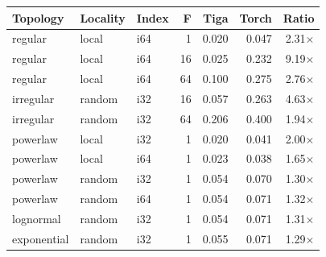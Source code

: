 \begin{tabular}{lllrrrr}
\toprule
Topology & Locality & Index & F & Tiga & Torch & Ratio \\
\midrule
regular & local & i64 & 1 & 0.020 & 0.047 & 2.31$\times$ \\
regular & local & i64 & 16 & 0.025 & 0.232 & 9.19$\times$ \\
regular & local & i64 & 64 & 0.100 & 0.275 & 2.76$\times$ \\
irregular & random & i32 & 16 & 0.057 & 0.263 & 4.63$\times$ \\
irregular & random & i32 & 64 & 0.206 & 0.400 & 1.94$\times$ \\
powerlaw & local & i32 & 1 & 0.020 & 0.041 & 2.00$\times$ \\
powerlaw & local & i64 & 1 & 0.023 & 0.038 & 1.65$\times$ \\
powerlaw & random & i32 & 1 & 0.054 & 0.070 & 1.30$\times$ \\
powerlaw & random & i64 & 1 & 0.054 & 0.071 & 1.32$\times$ \\
lognormal & random & i32 & 1 & 0.054 & 0.071 & 1.31$\times$ \\
exponential & random & i32 & 1 & 0.055 & 0.071 & 1.29$\times$ \\
\bottomrule
\end{tabular}
